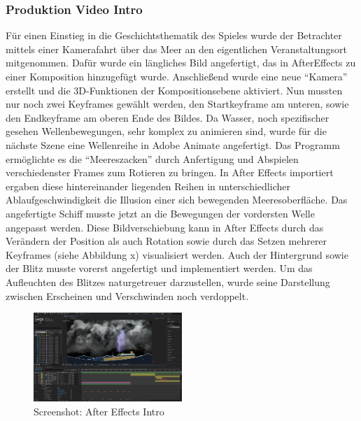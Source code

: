 \subsubsection{Produktion Video Intro}
Für einen Einstieg in die Geschichtsthematik des Spieles wurde der Betrachter mittels einer Kamerafahrt über das Meer an den eigentlichen Veranstaltungsort mitgenommen.
Dafür wurde ein längliches Bild angefertigt, das in AfterEffects zu einer Komposition hinzugefügt wurde. Anschließend wurde eine neue “Kamera” erstellt und die 3D-Funktionen der Kompositionsebene aktiviert. Nun mussten nur noch zwei Keyframes gewählt werden, den Startkeyframe am unteren, sowie den Endkeyframe am oberen Ende des Bildes.
Da Wasser, noch spezifischer gesehen Wellenbewegungen, sehr komplex zu animieren sind, wurde für die nächste Szene eine Wellenreihe in Adobe Animate angefertigt. Das Programm ermöglichte es die “Meereszacken” durch Anfertigung und Abspielen verschiedenster Frames zum Rotieren zu bringen. In After Effects importiert ergaben diese hintereinander liegenden Reihen in unterschiedlicher Ablaufgeschwindigkeit die Illusion einer sich bewegenden Meeresoberfläche. 
Das angefertigte Schiff musste jetzt an die Bewegungen der vordersten Welle angepasst werden. Diese Bildverschiebung kann in After Effects durch das Verändern der Position als auch Rotation sowie durch das Setzen mehrerer Keyframes (siehe Abbildung x) visualisiert werden. Auch der Hintergrund sowie der Blitz musste vorerst angefertigt und implementiert werden. Um das Aufleuchten des Blitzes naturgetreuer darzustellen, wurde seine Darstellung zwischen Erscheinen und Verschwinden noch verdoppelt. 

\begin{figure}
\includegraphics[width=0.5\textwidth]{../img/screenshot_aftereffects_intro.PNG}
\caption{Screenshot: After Effects Intro}
\label{fig:Screenshot: After Effects Intro}
\end{figure}